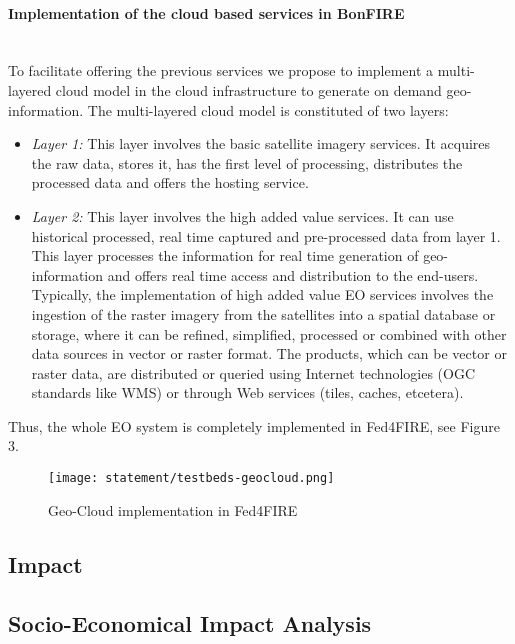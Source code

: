 \paragraph{Implementation of the cloud based services in BonFIRE}~\\
To facilitate offering the previous services we propose to implement a multi-layered cloud model in the \bonfire cloud infrastructure to generate on demand geo-information. The multi-layered cloud model is constituted of two layers:
\begin{itemize}
\item \emph{Layer 1:} This layer involves the basic satellite imagery services.  It acquires the raw data, stores it, has the first level of processing, distributes the processed data and offers the hosting service.

\item \emph{Layer 2:} This layer involves the high added value services. It can use historical processed, real time captured and pre-processed data from layer 1. This layer processes the information for real time generation of geo-information and offers real time access and distribution to the end-users. Typically, the implementation of high added value EO services involves the ingestion of the raster imagery from the satellites into a spatial database or storage, where it can be refined, simplified, processed or combined with other data sources in vector or raster format. The products, which can be vector or raster data, are distributed or queried using Internet technologies (OGC standards like WMS) or through Web services (tiles, caches, etcetera).
\end{itemize}

Thus, the whole EO system is completely implemented in Fed4FIRE, see Figure 3.

\begin{figure}[!h]
\begin{center}
\texttt{[image: statement/testbeds-geocloud.png]}
\caption{Geo-Cloud implementation in Fed4FIRE}
\label{fig:intr-testbeds-geocloud}
\end{center}
\end{figure}


\subsection{Impact}

\subsection{Socio-Economical Impact Analysis}

